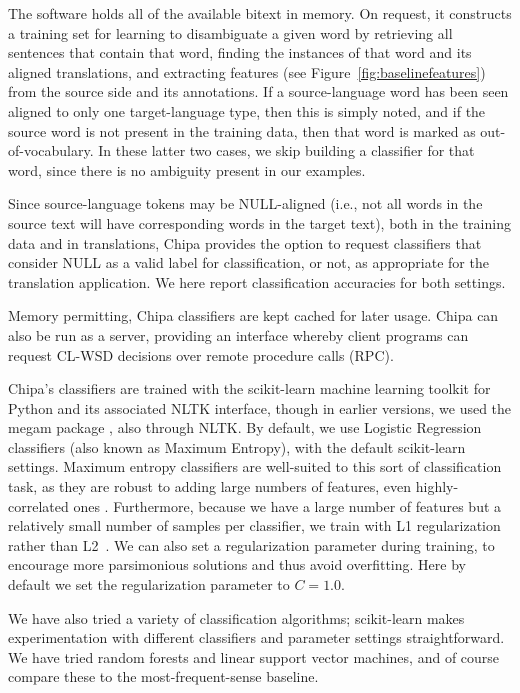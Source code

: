 The software holds all of the available bitext in memory. On request, it
constructs a training set for learning to disambiguate a given word
by retrieving all sentences that contain that word,
finding the instances of that word and its aligned translations, and extracting
features (see Figure~\ref{fig:baselinefeatures}) from the source side and its
annotations.
If a source-language word has been seen aligned to only one target-language
type, then this is simply noted, and if the source word is not present in the
training data, then that word is marked as out-of-vocabulary. In these latter
two cases, we skip building a classifier for that word, since there is no
ambiguity present in our examples.

Since source-language tokens may be NULL-aligned (i.e., not all words in the
source text will have corresponding words in the target text), both in the
training data and in translations, Chipa provides the option to request
classifiers that consider NULL as a valid label for classification, or not, as
appropriate for the translation application. We here report classification
accuracies for both settings.

Memory permitting, Chipa classifiers are kept cached for later usage. Chipa can
also be run as a server, providing an interface whereby client programs can
request CL-WSD decisions over remote procedure calls (RPC).

Chipa's classifiers are trained with the scikit-learn machine learning toolkit
\cite{scikit-learn} for Python and its associated NLTK interface, though in
earlier versions, we used the megam package \cite{daume04cg-bfgs}, also through
NLTK.  By default, we use Logistic Regression classifiers (also known as
Maximum Entropy), with the default scikit-learn settings.
Maximum entropy classifiers are well-suited to this sort of classification
task, as they are robust to adding large numbers of features, even
highly-correlated ones \cite{nigam1999using}.
Furthermore, because we have a large number of features but a relatively small
number of samples per classifier, we train with L1 regularization rather than
L2~\cite{ng2004feature}.
We can also set a regularization parameter during training, to encourage
more parsimonious solutions and thus avoid overfitting.
Here by default we set the regularization parameter to $C=1.0$.


We have also tried a variety of classification algorithms; scikit-learn makes
experimentation with different classifiers and parameter settings
straightforward. We have tried random forests and linear support vector
machines, and of course compare these to the most-frequent-sense baseline.

